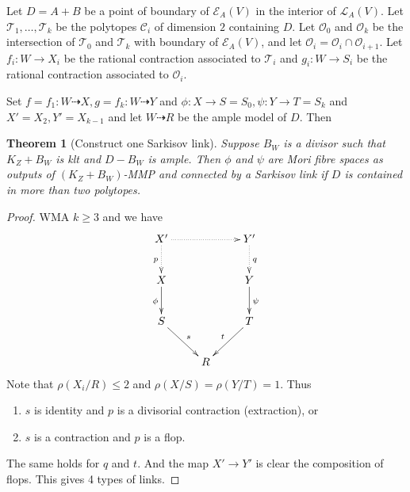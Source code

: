 \documentclass{article}
\newtheorem{thm}[defn]{Theorem}
\begin{document}
Let $ D=A+B $ be a point of boundary of $ \mathcal{E}_A(V) $ in the interior of $ \mathcal{L}_A(V) $. Let $ \mathcal{T}_1, \ldots, \mathcal{T}_k $ be the polytopes $ \mathcal{C}_i $ of dimension $ 2 $ containing $ D $. Let $ \mathcal{O}_0 $ and $ \mathcal{O}_k $ be the intersection of $ \mathcal{T}_0 $ and $ \mathcal{T}_k $ with boundary of $ \mathcal{E}_A(V) $, and let $ \mathcal{O}_i=\mathcal{O}_i\cap\mathcal{O}_{i+1} $. Let $ f_i:W\to X_i $ be the rational contraction associated to $ \mathcal{T}_i $ and $ g_i:W\to S_i $ be the rational contraction associated to $ \mathcal{O}_i $.

Set $ f=f_1:W\dashrightarrow X, g=f_k:W\dashrightarrow Y $ and $ \phi:X\to S=S_0,\psi:Y\to T=S_k $ and $ X'=X_2,Y'=X_{k-1} $ and let $ W\dashrightarrow R $ be the ample model of $ D $. Then
\begin{thm}[Construct one Sarkisov link]\label{constructlink}
  Suppose $ B_W $ is a divisor such that $ K_Z+B_W $ is klt and $ D-B_W $ is ample. Then $ \phi $ and $ \psi $ are Mori fibre spaces as outputs of $ (K_Z+B_W) $-MMP and connected by a Sarkisov link if $ D $ is contained in more than two polytopes.
\end{thm}
\begin{proof}
  WMA $ k\geqslant 3 $ and we have 
  $$ \xymatrix{
  X'\ar@{.>}[d]_p\ar@{.>}[rr]&&Y'\ar@{.>}[d]^q\\
  X\ar[d]_{\phi}&&Y\ar[d]^\psi\\
  S\ar[rd]^s&&T\ar[ld]_t\\
  &R&} $$
Note that $ \rho(X_i/R)\leqslant 2 $ and $ \rho(X/S)=\rho(Y/T)=1 $. Thus 
\begin{enumerate}
  \item $ s $ is identity and $ p $ is a divisorial contraction (extraction), or
  \item $ s $ is a contraction and $ p $ is a flop.
\end{enumerate}
The same holds for $ q $ and $ t $. And the map $X'\to Y'$ is clear the composition of flops. This gives 4 types of links.
\end{proof}
\end{document}
